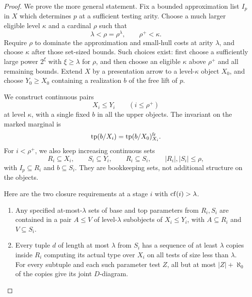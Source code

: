 \begin{proof}
We prove the more general statement. Fix a bounded approximation list
$I_p$ in $X$ which determines $p$ at a sufficient testing arity. Choose
a much larger eligible level $\kappa$ and a cardinal $\rho$ such that
\[
 \lambda<\rho=\rho^\lambda,
 \qquad \rho^+<\kappa.
\]
Require $\rho$ to dominate the approximation and small-hull costs at
arity $\lambda$, and choose $\kappa$ after those set-sized bounds. Such
choices exist: first choose a sufficiently large power $2^\xi$ with
$\xi\geq\lambda$ for $\rho$, and then choose an eligible $\kappa$
above $\rho^+$ and all remaining bounds. Extend $X$ by a presentation
arrow to a level-$\kappa$ object $X_0$, and choose $Y_0\geq X_0$
containing a realization $b$ of the free lift of $p$.

We construct continuous pairs
\[
 X_i\leq Y_i\qquad(i\leq\rho^+)
\]
at level $\kappa$, with a single fixed $b$ in all the upper objects.
The invariant on the marked marginal is
\begin{equation}\label{iso:matrix-marginal}
 \operatorname{tp}(b/X_i)=\operatorname{tp}(b/X_0)^{\mathrm{fr}}_{X_i}.
\end{equation}
For $i<\rho^+$, we also keep increasing continuous sets
\[
 R_i\subseteq X_i,\qquad S_i\subseteq Y_i,\qquad
 R_i\subseteq S_i,\qquad |R_i|,|S_i|\leq\rho,
\]
with $I_p\subseteq R_i$ and $b\subseteq S_i$. They are bookkeeping
sets, not additional structure on the objects.

Here are the two closure requirements at a stage $i$ with
$\operatorname{cf}(i)>\lambda$.
\begin{enumerate}
\item Any specified at-most-$\lambda$ sets of base and top parameters
from $R_i,S_i$ are contained in a pair $A\leq V$ of level-$\lambda$
subobjects of $X_i\leq Y_i$, with $A\subseteq R_i$ and
$V\subseteq S_i$.
\item Every tuple $d$ of length at most $\lambda$ from $S_i$ has a
sequence of at least $\lambda$ copies inside $R_i$ computing its
actual type over $X_i$ on all tests of size less than $\lambda$.
For every subtuple and each such parameter test $Z$, all but at most
$|Z|+\aleph_0$ of the copies give its joint $D$-diagram.
\end{enumerate}


\end{proof}
